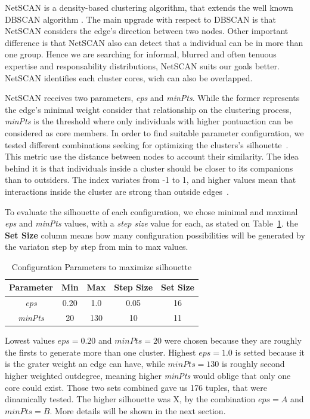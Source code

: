 \documentclass[conference]{IEEEtran}
\begin{document}
NetSCAN\cite{horta2018} is a density-based clustering algorithm, that extends the well known DBSCAN algorithm \cite{ester1996}. The main upgrade with respect to DBSCAN is that NetSCAN considers the edge's direction between two nodes. Other important difference is that NetSCAN also can detect that a individual can be in more than one group. Hence we are searching for informal, blurred and often tenuous expertise and responsability distributions, NetSCAN suits our goals better. NetSCAN identifies each cluster cores, wich can also be overlapped.

NetSCAN receives two parameters, \textit{eps} and \textit{minPts}. While the former represents the edge's minimal weight consider that relationship on the clustering process, \textit{minPts} is the threshold where only individuals with higher pontuaction can be considered as core members. In order to find suitable parameter configuration, we tested different combinations seeking for optimizing the clusters's silhouette~\cite{tan2005}. This metric use the distance between nodes to account their similarity. The idea behind it is that individuals inside a cluster should be closer to its companions than to outsiders. The index variates from -1 to 1, and higher values mean that interactions inside the cluster are strong than outside edges~\cite{almeida2011}.

To evaluate the silhouette of each configuration, we chose minimal and maximal \textit{eps} and \textit{minPts} values, with a \textit{step size} value for each, as stated on Table~\ref{tab:configparams}. the \textbf{Set Size} column means how many configuration possibilities will be generated by the variaton step by step from min to max values.

\begin{table}[htbp]
\caption{Configuration Parameters to maximize silhouette}
\begin{center}
\begin{tabular}{|c|c|c|c|c|}
\hline
\textbf{Parameter} & \textbf{Min}& \textbf{Max}& \textbf{Step Size} & \textbf{Set Size} \\
\hline
\textit{eps} & 0.20 & 1.0 & 0.05 & 16 \\
\hline
\textit{minPts} & 20 & 130 & 10 & 11 \\
\hline
\end{tabular}
\label{tab:configparams}
\end{center}
\end{table}

Lowest values $eps=0.20$ and $minPts=20$ were chosen because they are roughly the firsts to generate more than one cluster. Highest $eps=1.0$ is setted because it is the grater weight an edge can have, while $minPts=130$ is roughly second higher weighted outdegree, meaning higher \textit{minPts} would oblige that only one core could exist. Those two sets combined gave us 176 tuples, that were dinamically tested. The higher silhouette was X, by the combination $eps=A$ and $minPts=B$. More details will be shown in the next section.
\end{document}
